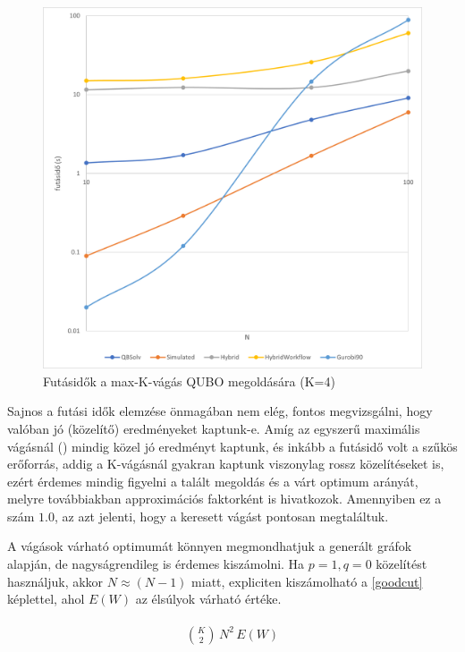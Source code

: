\begin{figure}[!ht]
	\centering
	\includegraphics[width=150mm, keepaspectratio]{figures/diagrams/maxKCutQUBO_K4.png}
	\caption{Futásidők a max-K-vágás QUBO megoldására (K=4)}
	\label{fig:maxKCutQUBO_K4}
\end{figure}

Sajnos a futási idők elemzése önmagában nem elég, fontos megvizsgálni, hogy valóban jó (közelítő) eredményeket kaptunk-e. Amíg az egyszerű maximális vágásnál () mindig közel jó eredményt kaptunk, és inkább a futásidő volt a szűkös erőforrás, addig a K-vágásnál gyakran kaptunk viszonylag rossz közelítéseket is, ezért érdemes mindig figyelni a talált megoldás és a várt optimum arányát, melyre továbbiakban approximációs faktorként is hivatkozok. Amennyiben ez a szám $1.0$, az azt jelenti, hogy a keresett vágást pontosan megtaláltuk.

A vágások várható optimumát könnyen megmondhatjuk a generált gráfok alapján, de nagyságrendileg is érdemes kiszámolni. Ha $p=1, q=0$ közelítést használjuk, akkor $N \approx (N-1)$ miatt, expliciten kiszámolható a \ref{goodcut} képlettel, ahol $E(W)$ az élsúlyok várható értéke.

\begin{align}
	\begin{split}
		\binom{K}{2} \, N^2 \, E(W) \label{goodcut}		
	\end{split}
\end{align}

